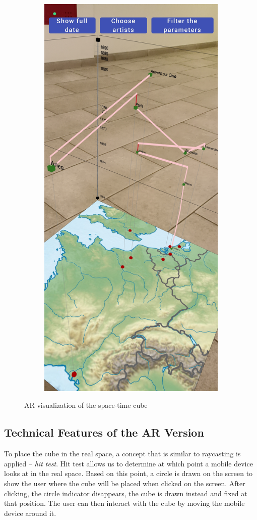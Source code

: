 \begin{figure}[hbt!]
\begin{subfigure}{.5\textwidth}
        \includegraphics[width=0.7\linewidth]{graphics/3-implementation/ar3}
    \end{subfigure}
    \caption{AR visualization of the space-time cube}
    \label{fig:figure3.15}
\end{figure}

\subsection{Technical Features of the AR Version}\label{subsec:specifics-of-the-ar-version}

To place the cube in the real space, a concept that is similar to raycasting is applied -- \emph{hit test}. Hit test allows us to determine at which
point a mobile device looks at in the real space. Based on this point, a circle is drawn on the screen to show the user where the
cube will be placed when clicked on the screen. After clicking, the circle indicator disappears, the cube is drawn instead and fixed at that
position. The user can then interact with the cube by moving the mobile device around it.

